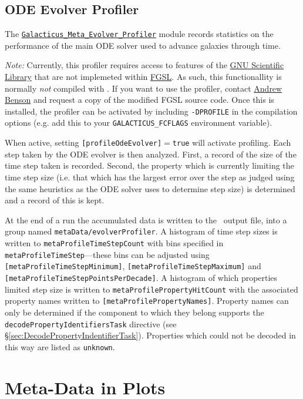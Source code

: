 \subsection{ODE Evolver Profiler}

The \hyperlink{galacticus.meta.evolver_profiler.F90:galacticus_meta_evolver_profiler}{{\tt Galacticus\_Meta\_Evolver\_Profiler}} module records statistics on the performance of the main ODE solver used to advance galaxies through time. 

\emph{Note:} Currently, this profiler requires access to features of the \href{http://www.gnu.org/software/gsl/}{GNU Scientific Library} that are not implemeted within \href{http://www.lrz-muenchen.de/services/software/mathematik/gsl/fortran/}{FGSL}. As such, this functionallity is normally \emph{not} compiled with \glc. If you want to use the profiler, contact \href{mailto:abenson@obs.carnegiescience.edu}{Andrew Benson} and request a copy of the modified FGSL source code. Once this is installed, the profiler can be activated by including {\tt -DPROFILE} in the compilation options (e.g. add this to your {\tt GALACTICUS\_FCFLAGS} environment variable).

When active, setting {\tt [profileOdeEvolver]}$=${\tt true} will activate profiling. Each step taken by the ODE evolver is then analyzed. First, a record of the size of the time step taken is recorded. Second, the property which is currently limiting the time step size (i.e. that which has the largest error over the step as judged using the same heuristics as the ODE solver uses to determine step size) is determined and a record of this is kept.

At the end of a run the accumulated data is written to the \glc\ output file, into a group named {\tt metaData/evolverProfiler}. A histogram of time step sizes is written to {\tt metaProfileTimeStepCount} with bins specified in {\tt metaProfileTimeStep}---these bins can be adjusted using {\tt [metaProfileTimeStepMinimum]}, {\tt [metaProfileTimeStepMaximum]} and {\tt [metaProfileTimeStepPointsPerDecade]}. A histogram of which properties limited step size is written to {\tt metaProfilePropertyHitCount} with the associated property names written to {\tt [metaProfilePropertyNames]}. Property names can only be determined if the component to which they belong supports the {\tt decodePropertyIdentifiersTask} directive (see \S\ref{sec:DecodePropertyIndentifierTask}). Properties which could not be decoded in this way are listed as {\tt unknown}.

\section{Meta-Data in Plots}

